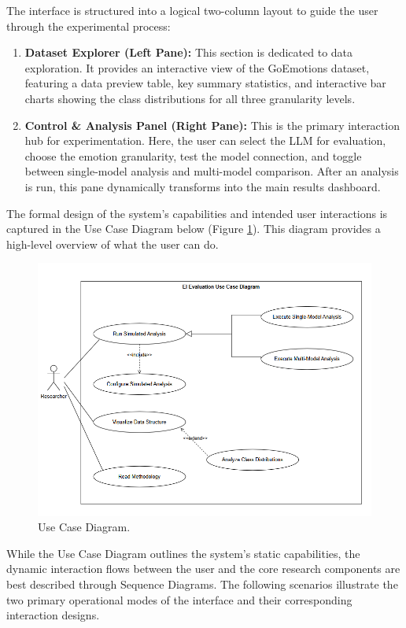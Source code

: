 The interface is structured into a logical two-column layout to guide the user through the experimental process:
\begin{enumerate}
    \item \textbf{Dataset Explorer (Left Pane):} This section is dedicated to data exploration. It provides an interactive view of the GoEmotions dataset, featuring a data preview table, key summary statistics, and interactive bar charts showing the class distributions for all three granularity levels.
    
    \item \textbf{Control \& Analysis Panel (Right Pane):} This is the primary interaction hub for experimentation. Here, the user can select the LLM for evaluation, choose the emotion granularity, test the model connection, and toggle between single-model analysis and multi-model comparison. After an analysis is run, this pane dynamically transforms into the main results dashboard.
\end{enumerate}

The formal design of the system's capabilities and intended user interactions is captured in the Use Case Diagram below (Figure \ref{fig:use_case}). This diagram provides a high-level overview of what the user can do.

\begin{figure}[H]
    \centering
    \includegraphics[width=\textwidth]{Images/UseCase1.PNG}
    \caption{Use Case Diagram.}
    \label{fig:use_case}
\end{figure}

While the Use Case Diagram outlines the system's static capabilities, the dynamic interaction flows between the user and the core research components are best described through Sequence Diagrams. The following scenarios illustrate the two primary operational modes of the interface and their corresponding interaction designs.

